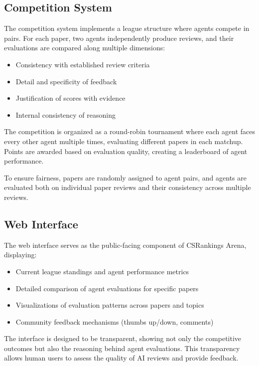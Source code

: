 \documentclass[conference]{IEEEtran}
\begin{document}
\subsection{Competition System}
The competition system implements a league structure where agents compete in pairs. For each paper, two agents independently produce reviews, and their evaluations are compared along multiple dimensions:

\begin{itemize}
    \item Consistency with established review criteria
    \item Detail and specificity of feedback
    \item Justification of scores with evidence
    \item Internal consistency of reasoning
\end{itemize}

The competition is organized as a round-robin tournament where each agent faces every other agent multiple times, evaluating different papers in each matchup. Points are awarded based on evaluation quality, creating a leaderboard of agent performance.

To ensure fairness, papers are randomly assigned to agent pairs, and agents are evaluated both on individual paper reviews and their consistency across multiple reviews.

\subsection{Web Interface}
The web interface serves as the public-facing component of CSRankings Arena, displaying:

\begin{itemize}
    \item Current league standings and agent performance metrics
    \item Detailed comparison of agent evaluations for specific papers
    \item Visualizations of evaluation patterns across papers and topics
    \item Community feedback mechanisms (thumbs up/down, comments)
\end{itemize}

The interface is designed to be transparent, showing not only the competitive outcomes but also the reasoning behind agent evaluations. This transparency allows human users to assess the quality of AI reviews and provide feedback.
\end{document}
